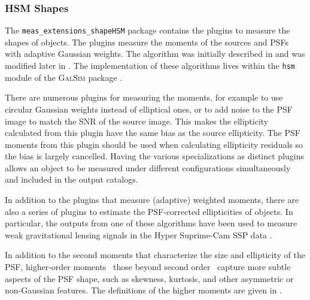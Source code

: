 \subsubsection{HSM Shapes}
\label{sec:hsm}

The \texttt{meas\_extensions\_shapeHSM} package contains the plugins to measure the shapes of objects.
The plugins measure the moments of the sources and PSFs with adaptive Gaussian weights.
The algorithm was initially described in \citet{2003MNRAS.343..459H} and was modified later in \citet{2005MNRAS.361.1287M}.
The implementation of these algorithms lives within the \texttt{hsm} module of the \textsc{GalSim} package \citep{2015A&C....10..121R}.

There are numerous plugins for measuring the moments, for example to use circular Gaussian weights instead of elliptical ones, or to add noise to the PSF image to match the SNR of the source image.
This makes the ellipticity calculated from this plugin have the same bias as the source ellipticity.
The PSF moments from this plugin should be used when calculating ellipticity residuals so the bias is largely cancelled.
Having the various specializations as distinct plugins allows an object to be measured under different configurations simultaneously and included in the output catalogs.

In addition to the plugins that measure (adaptive) weighted moments, there are also a series of plugins to estimate the PSF-corrected ellipticities of objects.
In particular, the outputs from one of these algorithms have been used to measure weak gravitational lensing signals in the Hyper Suprime-Cam SSP data \citep{2018PASJ...70S..25M, 2022PASJ...74..421L}.

In addition to the second moments that characterize the size and ellipticity of the PSF, higher-order moments \textemdash\ those beyond second order \textemdash\ capture more subtle aspects of the PSF shape, such as skewness, kurtosis, and other asymmetric or non-Gaussian features.
The definitions of the higher moments are given in \citet{2023MNRAS.520.2328Z}.
